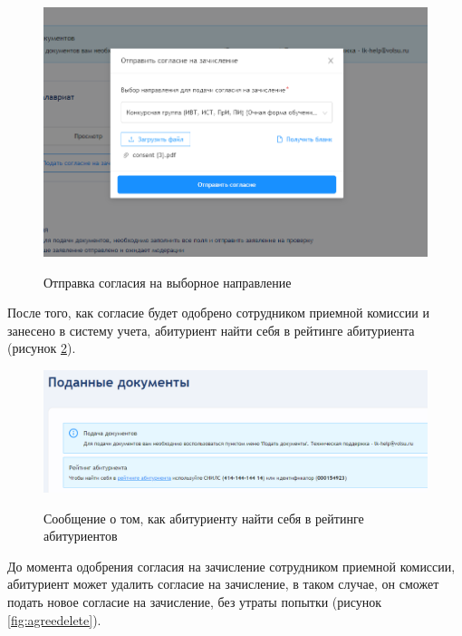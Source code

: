\begin{figure}[H]
\begin{center}
\includegraphics[width=0.9\hsize]{fig/agree-send.png}\\[2mm]
\caption{Отправка согласия на выборное направление}\label{fig:agresend}
\end{center}
\end{figure}

После того, как согласие будет одобрено сотрудником приемной комиссии и занесено в систему учета, абитуриент найти себя в рейтинге абитуриента (рисунок \ref{fig:agreerating}).

\begin{figure}[H]
\begin{center}
\includegraphics[width=0.9\hsize]{fig/agree-rating.png}\\[2mm]
\caption{Сообщение о том, как абитуриенту найти себя в рейтинге абитуриентов}\label{fig:agreerating}
\end{center}
\end{figure}

До момента одобрения согласия на зачисление сотрудником приемной комиссии, абитуриент может удалить согласие на зачисление, в таком случае, он сможет подать новое согласие на зачисление, без утраты попытки (рисунок \ref{fig:agreedelete}).

